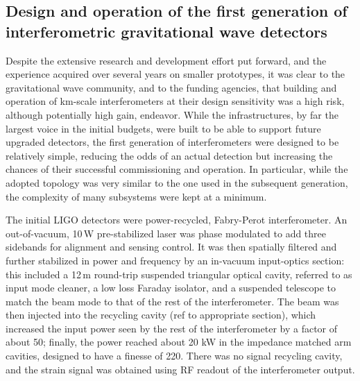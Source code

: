 \subsection{Design and operation of the first generation of interferometric gravitational wave detectors}\label{subsec:1stgen}

Despite the extensive research and development effort put forward, and the experience acquired over several years on smaller prototypes, it was clear to the gravitational wave community, and to the funding agencies, that building and operation of km-scale interferometers at their design sensitivity was a high risk, although potentially high gain, endeavor.
While the infrastructures, by far the largest voice in the initial budgets, were built to be able to support future upgraded detectors, the first generation of interferometers were designed to be relatively simple, reducing the odds of an actual detection but increasing the chances of their successful commissioning and operation.
In particular, while the adopted topology was very similar to the one used in the subsequent generation, the complexity of many subsystems were kept at a minimum.

The initial LIGO detectors\cite{Abbott_2004} were power-recycled, Fabry-Perot interferometer.
An out-of-vacuum, 10\,W pre-stabilized laser was phase modulated to add three sidebands for alignment and sensing control.
It was then spatially filtered and further stabilized in power and frequency by an in-vacuum input-optics section: this included a 12\,m round-trip suspended triangular optical cavity, referred to as input mode cleaner, a low loss Faraday isolator, and a suspended telescope to match the beam mode to that of the rest of the interferometer.
The beam was then injected into the recycling cavity (ref to appropriate section), which increased the input power seen by the rest of the interferometer by a factor of about 50; finally, the power reached about 20 kW in the impedance matched arm cavities, designed to have a finesse of 220. There was no signal recycling cavity, and the strain signal was obtained using RF readout of the interferometer output.


